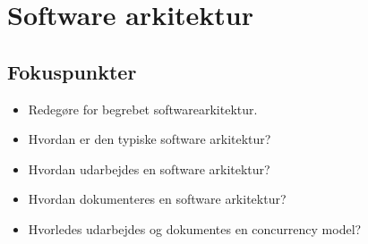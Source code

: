 \section{Software arkitektur}

\subsection{Fokuspunkter}

\begin{itemize}
	\item Redegøre for begrebet softwarearkitektur.
	\item Hvordan er den typiske software arkitektur?
	\item Hvordan udarbejdes en software arkitektur?
	\item Hvordan dokumenteres en software arkitektur?
	\item Hvorledes udarbejdes og dokumentes en concurrency model?
	\end{itemize}